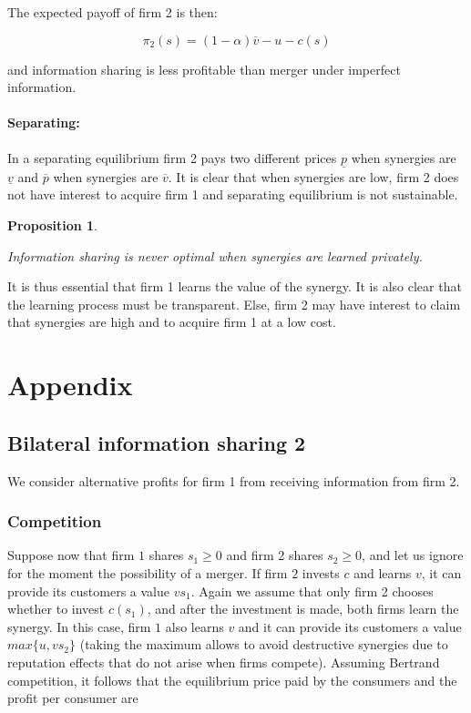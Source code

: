 \documentclass[a4paper,leqno]{article}%
\newtheorem{prop}{Proposition}
\renewcommand{\a}{\alpha}
\newcommand{\uv}{\underline{v}}
\newcommand{\ov}{\overline{v}}
\newcommand{\up}{\underline{p}}
\newcommand{\op}{\overline{p}}
\begin{document}
The expected payoff of firm 2 is then:

\[
\pi_2(s)=(1-\a) \ov-u-c(s)
\]

and information sharing is less profitable than merger under imperfect information.



\paragraph{Separating:}

\medskip  

In a separating equilibrium firm 2 pays two different prices $\up$ when synergies are $\uv$ and $\op$ when synergies are $\ov$. It is clear that when synergies are low, firm 2 does not have interest to acquire firm 1 and separating equilibrium is not sustainable.

\medskip

\begin{prop}~~

Information sharing is never optimal when synergies are learned privately.

\end{prop}

It is thus essential that firm 1 learns the value of the synergy. It is also clear that the learning process must be transparent. Else, firm 2 may have interest to claim that synergies are high and to acquire firm 1 at a low cost.






\appendix

\section{Appendix}


\subsection{Bilateral information sharing 2}


We consider alternative profits for firm 1 from receiving information from firm 2.

\subsubsection{Competition}

Suppose now that firm $1$ shares $s_1\geq 0$ and firm 2 shares $s_2\geq0$, and let us ignore for the moment the possibility of a merger. If firm $2$ invests $c$ and learns $v$, it can provide its customers a value $vs_1$. Again we assume that only firm 2 chooses whether to invest $c(s_1)$, and after the investment is made, both firms learn the synergy. In this case, firm $1$ also learns $v$ and it can provide its customers a value $max\{u,vs_2\}$ (taking the maximum allows to avoid destructive synergies due to reputation effects that do not arise when firms compete). Assuming Bertrand competition, it follows that the equilibrium price paid by the consumers and the profit per consumer are
\end{document}
